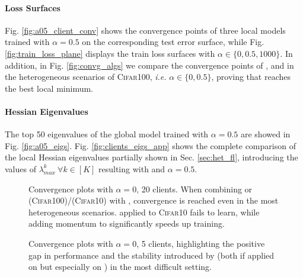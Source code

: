 \paragraph{Loss Surfaces} Fig. \ref{fig:a05_client_conv} shows the convergence points of three local models trained with $\alpha=0.5$ on the corresponding test error surface, while Fig. \ref{fig:train_loss_plane} displays the train loss surfaces with $\alpha\in\{0,0.5,1000\}$. In addition, in Fig. \ref{fig:convg_algs} we compare the convergence points of \fedavg, \fedsam and \fedasam in the heterogeneous scenarios of \textsc{Cifar100}, \textit{i.e.} $\alpha\in\{0,0.5\}$, proving that \asam reaches the best local minimum. 
\paragraph{Hessian Eigenvalues} The top 50 eigenvalues of the global model trained with $\alpha=0.5$ are showed in Fig. \ref{fig:a05_eigs}. Fig. \ref{fig:clients_eigs_app} shows the complete comparison of the local Hessian eigenvalues partially shown in Sec. \ref{sec:het_fl}, introducing the values of $\lambda_{max}^k \: \forall k \in [K]$ resulting with \sam and $\alpha=0.5$. 

\captionsetup[subfloat]{font=scriptsize,labelformat=empty}
\begin{figure}
    \centering
    \caption{Convergence plots with $\alpha=0$, 20 clients. When combining \fedavgm or \fedsam (\textsc{Cifar100})/\fedasam (\textsc{Cifar10}) with \swa, convergence is reached even in the most heterogeneous scenarios. \fedavgmswa applied to \textsc{Cifar10} fails to learn, while adding momentum to \fedasam significantly speeds up training.}
    \label{fig:convergence}
\end{figure}

\begin{figure}
    \centering
    \caption{Convergence plots with $\alpha=0$, 5 clients, highlighting the positive gap in performance and the stability introduced by \swa (both if applied on \fedavg but especially on \fedasam) in the most difficult setting.}
    \label{fig:conv_k5}
\end{figure}


